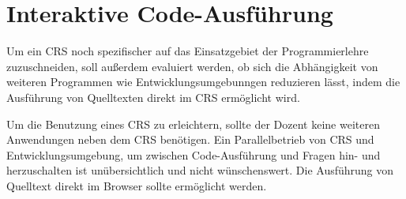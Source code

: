 \section{Interaktive Code-Ausführung}
\label{chap:codeausfuehrung}
Um ein CRS noch spezifischer auf das Einsatzgebiet der Programmierlehre zuzuschneiden, soll außerdem evaluiert werden, ob sich die Abhängigkeit von weiteren Programmen wie Entwicklungsumgebunngen reduzieren lässt, indem die Ausführung von Quelltexten direkt im CRS ermöglicht wird.

Um die Benutzung eines CRS zu erleichtern, sollte der Dozent keine weiteren Anwendungen neben dem CRS benötigen. Ein Parallelbetrieb von CRS und Entwicklungsumgebung, um zwischen Code-Ausführung und Fragen hin- und herzuschalten ist unübersichtlich und nicht wünschenswert. Die Ausführung von Quelltext direkt im Browser sollte ermöglicht werden.
